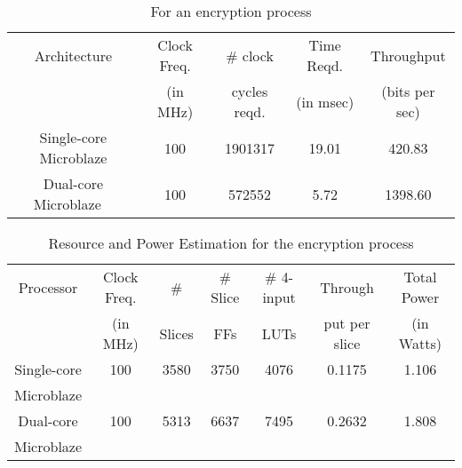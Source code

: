 \documentclass[preprint,12pt]{elsarticle}
\begin{document}
\begin{table}[htbp]
\caption{For an encryption process} \centering \begin{tabular}{|c |c |c |c |c|} \hline\hline Architecture & Clock Freq. & \# clock & Time Reqd. & Throughput \\ [0.5ex] & (in MHz) & cycles reqd. & (in msec) & (bits per sec) \\[0.5ex]
\hline\hline
Single-core Microblaze & 100 & 1901317 & 19.01 & 420.83\\
Dual-core Microblaze \ & 100 & 572552 & 5.72 & 1398.60\\
\hline \end{tabular}
\label{table:Throughput calculation} \end{table}
\vspace{-20pt}
\begin{table}[htbp]
\caption{Resource and Power Estimation for the encryption process} \centering \begin{tabular}{|c| c| c| c| c| c| c|} \hline\hline Processor & Clock Freq. & \# & \# Slice & \# 4-input & Through & Total Power\\ [0.5ex] & (in MHz) & Slices &  FFs &  LUTs & put per slice & (in Watts) \\[0.5ex]
\hline\hline
Single-core & 100 & 3580 & 3750 & 4076 & 0.1175 &1.106\\
Microblaze &  &  &  &  &  &\\
Dual-core & 100 & 5313 & 6637 & 7495 & 0.2632 & 1.808\\
Microblaze &  &  &  &  &  &\\
\hline \end{tabular}
\label{table:Resource and power calculation} \end{table}
\end{document}

